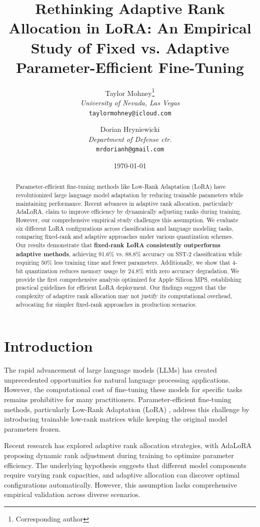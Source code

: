 \documentclass[11pt,a4paper]{article}
\title{Rethinking Adaptive Rank Allocation in LoRA: An Empirical Study of Fixed vs. Adaptive Parameter-Efficient Fine-Tuning}
\author{
Taylor Mohney\thanks{Corresponding author} \\
\textit{University of Nevada, Las Vegas} \\
\texttt{taylormohney@icloud.com}
\and
Dorian Hryniewicki \\
\textit{Department of Defense ctr.} \\
\texttt{mrdorianh@gmail.com}
}
\date{\today}
\begin{document}
\maketitle

\begin{abstract}
Parameter-efficient fine-tuning methods like Low-Rank Adaptation (LoRA) have revolutionized large language model adaptation by reducing trainable parameters while maintaining performance. Recent advances in adaptive rank allocation, particularly AdaLoRA, claim to improve efficiency by dynamically adjusting ranks during training. However, our comprehensive empirical study challenges this assumption. We evaluate six different LoRA configurations across classification and language modeling tasks, comparing fixed-rank and adaptive approaches under various quantization schemes. Our results demonstrate that \textbf{fixed-rank LoRA consistently outperforms adaptive methods}, achieving 91.6\% vs. 88.8\% accuracy on SST-2 classification while requiring 50\% less training time and fewer parameters. Additionally, we show that 4-bit quantization reduces memory usage by 24.8\% with zero accuracy degradation. We provide the first comprehensive analysis optimized for Apple Silicon MPS, establishing practical guidelines for efficient LoRA deployment. Our findings suggest that the complexity of adaptive rank allocation may not justify its computational overhead, advocating for simpler fixed-rank approaches in production scenarios.
\end{abstract}

\section{Introduction}

The rapid advancement of large language models (LLMs) has created unprecedented opportunities for natural language processing applications. However, the computational cost of fine-tuning these models for specific tasks remains prohibitive for many practitioners. Parameter-efficient fine-tuning methods, particularly Low-Rank Adaptation (LoRA) \cite{hu2021lora}, address this challenge by introducing trainable low-rank matrices while keeping the original model parameters frozen.

Recent research has explored adaptive rank allocation strategies, with AdaLoRA \cite{zhang2023adaptive} proposing dynamic rank adjustment during training to optimize parameter efficiency. The underlying hypothesis suggests that different model components require varying rank capacities, and adaptive allocation can discover optimal configurations automatically. However, this assumption lacks comprehensive empirical validation across diverse scenarios.
\end{document}
